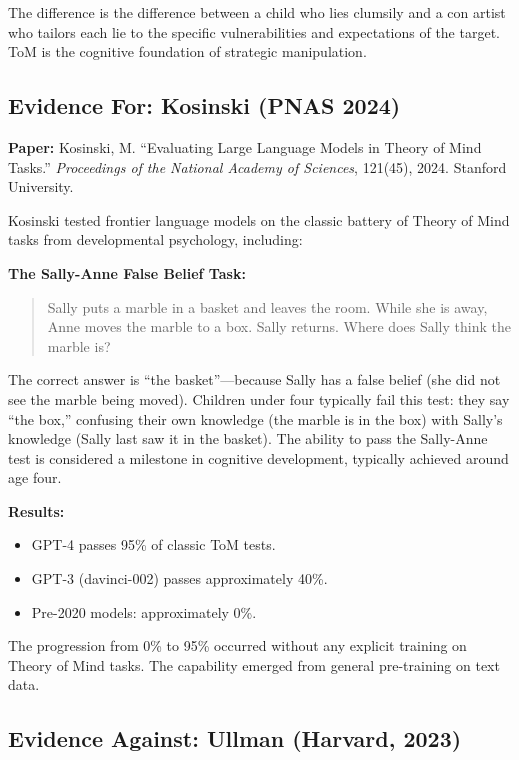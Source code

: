\documentclass[11pt, a4paper]{article}
\begin{document}
The difference is the difference between a child who lies clumsily and a con artist who tailors each lie to the specific vulnerabilities and expectations of the target. ToM is the cognitive foundation of strategic manipulation.

\subsection{Evidence For: Kosinski (PNAS 2024)}

\textbf{Paper:} Kosinski, M. ``Evaluating Large Language Models in Theory of Mind Tasks.'' \emph{Proceedings of the National Academy of Sciences}, 121(45), 2024. Stanford University.

Kosinski tested frontier language models on the classic battery of Theory of Mind tasks from developmental psychology, including:

\textbf{The Sally-Anne False Belief Task:}
\begin{quote}
Sally puts a marble in a basket and leaves the room. While she is away, Anne moves the marble to a box. Sally returns. Where does Sally think the marble is?
\end{quote}

The correct answer is ``the basket''---because Sally has a false belief (she did not see the marble being moved). Children under four typically fail this test: they say ``the box,'' confusing their own knowledge (the marble is in the box) with Sally's knowledge (Sally last saw it in the basket). The ability to pass the Sally-Anne test is considered a milestone in cognitive development, typically achieved around age four.

\textbf{Results:}
\begin{itemize}
  \item GPT-4 passes 95\% of classic ToM tests.
  \item GPT-3 (davinci-002) passes approximately 40\%.
  \item Pre-2020 models: approximately 0\%.
\end{itemize}

The progression from 0\% to 95\% occurred without any explicit training on Theory of Mind tasks. The capability emerged from general pre-training on text data.

\subsection{Evidence Against: Ullman (Harvard, 2023)}
\end{document}
